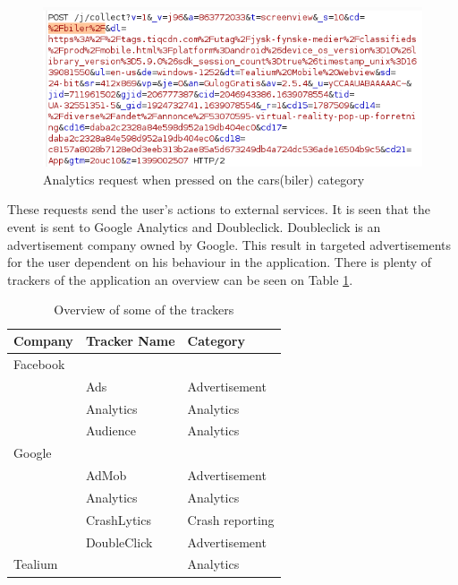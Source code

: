 \begin{figure}[htbp]
    \centering
    \includegraphics[width=1\columnwidth]{../dynamic-analysis/pictures/analytics-request-cars.png}
    \caption{Analytics request when pressed on the cars(biler) category}
    \label{fig:statistic-request-car}
\end{figure}

These requests send the user's actions to external services. It is seen that the event is sent to Google Analytics and Doubleclick. Doubleclick is an advertisement company owned by Google. This result in targeted advertisements for the user dependent on his behaviour in the application. There is plenty of trackers of the application an overview can be seen on Table \ref{tab:trackers}. 

\begin{table}[]
    \centering
    \begin{tabular}{|l|l|l|}
    \hline
    \textbf{Company} & \textbf{Tracker Name} & \textbf{Category} \\ \hline
    Facebook         &                       &                   \\ \hline
                     & Ads                   & Advertisement     \\
                     & Analytics             & Analytics         \\
                     & Audience              & Analytics         \\ \hline
    Google           &                       &                   \\ \hline
                     & AdMob                 & Advertisement     \\
                     & Analytics             & Analytics         \\
                     & CrashLytics           & Crash reporting   \\
                     & DoubleClick           & Advertisement     \\ \hline
    Tealium          &                       & Analytics         \\ \hline
    \end{tabular}
    \caption{Overview of some of the trackers}
    \label{tab:trackers}
\end{table}

